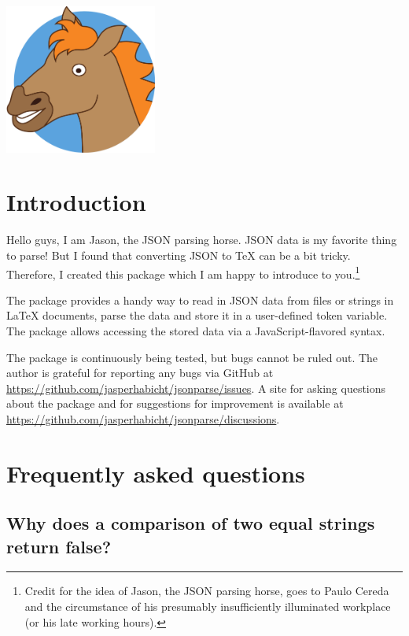 \documentclass[a4paper]{article}
\begin{document}
\vspace*{-1cm}
\noindent\hspace*{-3.5mm}\includegraphics[width=5cm]{jason/jason.pdf}

\printdoctitle

\bigskip

\section{Introduction}

Hello guys, I am Jason, the JSON parsing horse. JSON data is my favorite thing to parse! But I found that converting JSON to TeX can be a bit tricky. Therefore, I created this package which I am happy to introduce to you.\footnote{Credit for the idea of Jason, the JSON parsing horse, goes to Paulo Cereda and the circumstance of his presumably insufficiently illuminated workplace (or his late working hours).}

The  package provides a handy way to read in JSON data from files or strings in LaTeX documents, parse the data and store it in a user-defined token variable. The package allows accessing the stored data via a JavaScript-flavored syntax.

The package is continuously being tested, but bugs cannot be ruled out. The author is grateful for reporting any bugs via GitHub at \url{https://github.com/jasperhabicht/jsonparse/issues}. A site for asking questions about the package and for suggestions for improvement is available at \url{https://github.com/jasperhabicht/jsonparse/discussions}.

\section{Frequently asked questions}

\subsection{Why does a comparison of two equal strings return false?}
\end{document}
